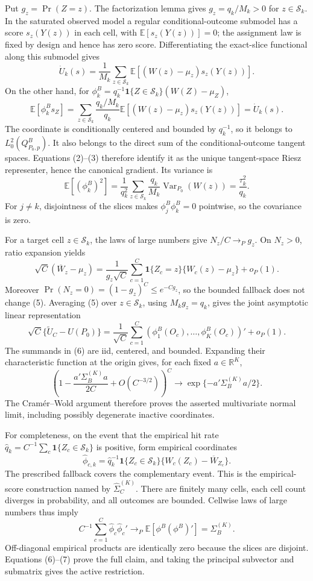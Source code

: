 Put \(g_z=\Pr(Z=z)\).  The factorization lemma gives \(g_z=q_k/M_k>0\) for \(z\in\mathcal S_k\).  In the saturated observed model a regular conditional-outcome submodel has a score \(s_z(Y(z))\) in each cell, with \(\mathbb E[s_z(Y(z))]=0\); the assignment law is fixed by design and hence has zero score.  Differentiating the exact-slice functional along this submodel gives
\[
 \dot U_k(s)=\frac1{M_k}\sum_{z\in\mathcal S_k}
 \mathbb E[(W(z)-\mu_z)s_z(Y(z))]. \tag{2}
\]
On the other hand, for \(\phi_k^B=q_k^{-1}{\mathbf 1}\{Z\in\mathcal S_k\}(W(Z)-\mu_Z)\),
\[
 \mathbb E[\phi_k^B s_Z]
 =\sum_{z\in\mathcal S_k}\frac{q_k/M_k}{q_k}
 \mathbb E[(W(z)-\mu_z)s_z(Y(z))]
 =\dot U_k(s). \tag{3}
\]
The coordinate is conditionally centered and bounded by \(q_k^{-1}\), so it belongs to \(L_0^2(Q^B_{P_0,p})\).  It also belongs to the direct sum of the conditional-outcome tangent spaces.  Equations (2)--(3) therefore identify it as the unique tangent-space Riesz representer, hence the canonical gradient.  Its variance is
\[
 \mathbb E[(\phi_k^B)^2]
 =\frac1{q_k^2}\sum_{z\in\mathcal S_k}\frac{q_k}{M_k}\operatorname{Var}_{P_0}(W(z))
 =\frac{\tau_k^2}{q_k}. \tag{4}
\]
For \(j\ne k\), disjointness of the slices makes \(\phi_j^B\phi_k^B=0\) pointwise, so the covariance is zero.

For a target cell \(z\in\mathcal S_k\), the laws of large numbers give \(N_z/C\to_Pg_z\).  On \(N_z>0\), ratio expansion yields
\[
 \sqrt C(\overline W_z-\mu_z)
 =\frac1{g_z\sqrt C}\sum_{c=1}^C{\mathbf 1}\{Z_c=z\}\{W_c(z)-\mu_z\}+o_P(1). \tag{5}
\]
Moreover \(\Pr(N_z=0)=(1-g_z)^C\leq e^{-Cg_z}\), so the bounded fallback does not change (5).  Averaging (5) over \(z\in\mathcal S_k\), using \(M_kg_z=q_k\), gives the joint asymptotic linear representation
\[
 \sqrt C\{\widetilde U_C-U(P_0)\}
 =\frac1{\sqrt C}\sum_{c=1}^C(\phi_1^B(O_c),\ldots,\phi_K^B(O_c))'+o_P(1). \tag{6}
\]
The summands in (6) are iid, centered, and bounded.  Expanding their characteristic function at the origin gives, for each fixed \(a\in\mathbb R^K\),
\[
 \left(1-\frac{a'\Sigma_B^{(K)}a}{2C}+O(C^{-3/2})\right)^C
 \longrightarrow \exp\{-a'\Sigma_B^{(K)}a/2\}.
\]
The Cram\'er--Wold argument therefore proves the asserted multivariate normal limit, including possibly degenerate inactive coordinates.

For completeness, on the event that the empirical hit rate \(\widehat q_k=C^{-1}\sum_c{\mathbf 1}\{Z_c\in\mathcal S_k\}\) is positive, form empirical coordinates
\[
 \widehat\phi_{c,k}=\widehat q_k^{-1}{\mathbf 1}\{Z_c\in\mathcal S_k\}
 \{W_c(Z_c)-\overline W_{Z_c}\}.
\]
The prescribed fallback covers the complementary event.  This is the empirical-score construction named by \(\widehat\Sigma_C^{(K)}\).  There are finitely many cells, each cell count diverges in probability, and all outcomes are bounded.  Cellwise laws of large numbers thus imply
\[
 C^{-1}\sum_{c=1}^C\widehat\phi_c\widehat\phi_c'
 \to_P\mathbb E[\phi^B(\phi^B)']=\Sigma_B^{(K)}. \tag{7}
\]
Off-diagonal empirical products are identically zero because the slices are disjoint.  Equations (6)--(7) prove the full claim, and taking the principal subvector and submatrix gives the active restriction.